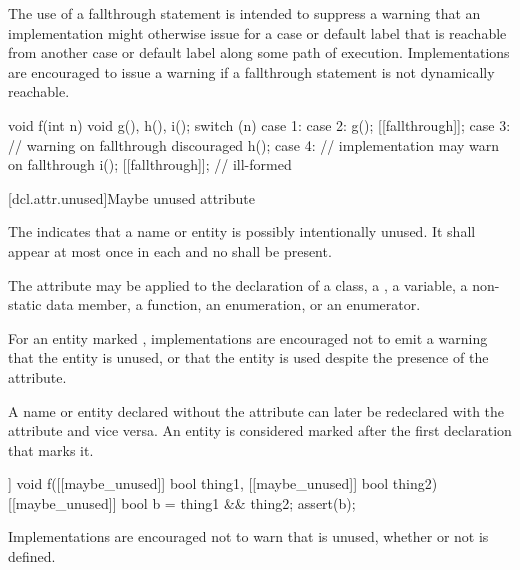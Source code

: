 \pnum
\begin{note}
The use of a fallthrough statement is intended to suppress
a warning that an implementation might otherwise issue
for a case or default label that is reachable
from another case or default label along some path of execution.
Implementations are encouraged to issue a warning
if a fallthrough statement is not dynamically reachable.
\end{note}

\pnum
\begin{example}
\begin{codeblock}
void f(int n) {
  void g(), h(), i();
  switch (n) {
  case 1:
  case 2:
    g();
    [[fallthrough]];
  case 3: // warning on fallthrough discouraged
    h();
  case 4: // implementation may warn on fallthrough
    i();
    [[fallthrough]]; // ill-formed
  }
}
\end{codeblock}
\end{example}

[dcl.attr.unused]{Maybe unused attribute}%

\pnum
The  
indicates that a name or entity is possibly intentionally unused.
It shall appear at most once in each  and
no  shall be present.

\pnum
The attribute may be applied to the declaration of a class,
a , a variable, a non-static data member,
a function, an enumeration, or an enumerator.

\pnum
\begin{note}
For an entity marked , implementations
are encouraged not to emit a warning that the entity is unused, or
that the entity is used despite the presence of the attribute.
\end{note}

\pnum
A name or entity declared without the  attribute
can later be redeclared with the attribute
and vice versa.
An entity is considered marked
after the first declaration that marks it.

\pnum
\begin{example}
\begin{codeblock}
[[maybe_unused]] void f([[maybe_unused]] bool thing1,
                        [[maybe_unused]] bool thing2) {
  [[maybe_unused]] bool b = thing1 && thing2;
  assert(b);
}
\end{codeblock}
Implementations are encouraged not to warn that  is unused,
whether or not  is defined.
\end{example}

